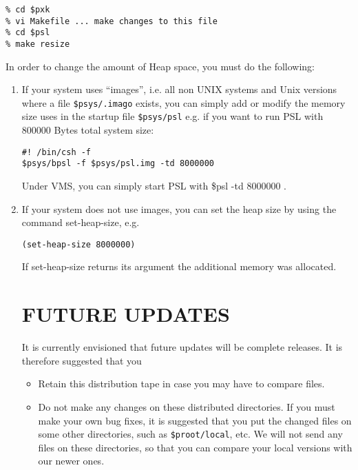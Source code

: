\begin{verbatim}
% cd $pxk
% vi Makefile ... make changes to this file
% cd $psl
% make resize
\end{verbatim}

In order to change the amount of Heap space, you must do the
following:

\begin{enumerate}

\item If your system uses ``images'', i.e. all non UNIX systems and
Unix versions where a file {\tt \$psys/.imago} exists, you can simply add
or modify the memory size uses in the startup file {\tt \$psys/psl}
e.g. if you want to run PSL with 800000 Bytes total system size:

\begin{verbatim}
#! /bin/csh -f
$psys/bpsl -f $psys/psl.img -td 8000000
\end{verbatim}

Under VMS, you can simply start PSL with  \$psl -td 8000000  .


\item If your system does not use images, you can set the heap size
by using the command set-heap-size, e.g.

\begin{verbatim}
(set-heap-size 8000000)
\end{verbatim}

If set-heap-size returns its argument the additional memory was allocated. 

\section{FUTURE UPDATES}

It is currently envisioned that future updates will be complete
releases.  It is therefore suggested that you

\begin{itemize}

\item Retain this distribution tape in case you may have to compare files.

\item Do not make any changes on these distributed directories. If you must
make your own bug fixes, it is suggested that you put the changed
files on some other directories, such as {\tt \$proot/local}, etc.  We
will not send any files on these directories, so that you can compare
your local versions with our newer ones.


\end{itemize}
\end{enumerate}

